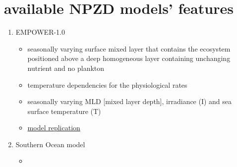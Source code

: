 \documentclass[a4paper,11pt]{article}
\begin{document}
    \section{available NPZD models' features}
    \begin{enumerate}
        \item EMPOWER-1.0\autocite{anderson2015empower}
        \begin{itemize}
            \item seasonally varying surface mixed layer that contains the ecosystem positioned above a deep homogeneous layer containing unchanging nutrient and no plankton
            \item temperature dependencies for the physiological rates
            \item seasonally varying MLD [mixed layer depth], irradiance (I) and sea surface temperature (T)
            \item \href{https://nbviewer.jupyter.org/github/ph-u/Project/blob/master/sandbox/m_NPZD_anderson2015empower.ipynb}{model replication}
        \end{itemize}
        \item Southern Ocean model\autocite{kidston2013phytoplankton}
        \begin{itemize}
            \item 
        \end{itemize}
    \end{enumerate}
    
    \nocite{*}\printbibliography
\end{document}
